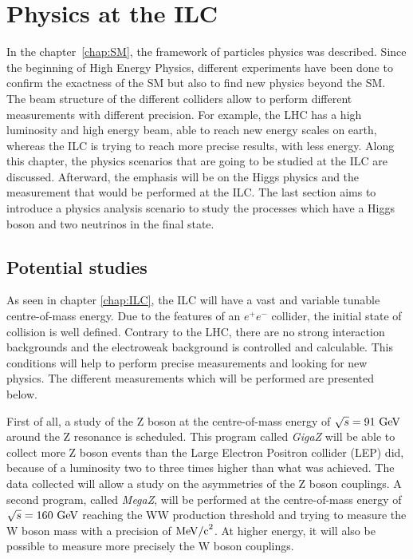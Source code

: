 \chapter{Physics at the ILC}

  In the chapter~\ref{chap:SM}, the framework of particles physics was described. 
  Since the beginning of High Energy Physics, different experiments have been done to confirm the exactness of the SM but also to find new physics beyond the SM. 
  The beam structure of the different colliders allow to perform different measurements with different precision. 
  For example, the LHC has a high luminosity and high energy beam, able to reach new energy scales on earth, whereas the ILC is trying to reach more precise results, with less energy. 
  Along this chapter, the physics scenarios that are going to be studied at the ILC are discussed. 
  Afterward, the emphasis will be on the Higgs physics and the measurement that would be performed at the ILC. 
  The last section aims to introduce a physics analysis scenario to study the processes which have a Higgs boson and two neutrinos in the final state.
 
 \minitoc

  \section{Potential studies}

  As seen in chapter \ref{chap:ILC}, the ILC will have a vast and variable tunable centre-of-mass energy.
  Due to the features of an $e^+e^-$ collider, the initial state of collision is well defined.
  Contrary to the LHC, there are no strong interaction backgrounds and the electroweak background is controlled and calculable.
  This conditions will help to perform precise measurements and looking for new physics. 
  The different measurements which will be performed are presented below.

   First of all, a study of the Z boson at the centre-of-mass energy of $\sqrt{s} = 91~\rm{GeV}$ around the Z resonance is scheduled. 
   This program called \textit{GigaZ} will be able to collect more Z boson events than the Large Electron Positron collider (LEP) did, because of a luminosity two to three times higher than what was achieved. 
   The data collected will allow a study on the asymmetries of the Z boson couplings. 
   A second program, called \textit{MegaZ}, will be performed at the centre-of-mass energy of $\sqrt{s} = 160~\rm{GeV}$ reaching the WW production threshold and trying to measure the W boson mass with a precision of $\rm{MeV/c}^2$.
   At higher energy, it will also be possible to measure more precisely the W boson couplings.

